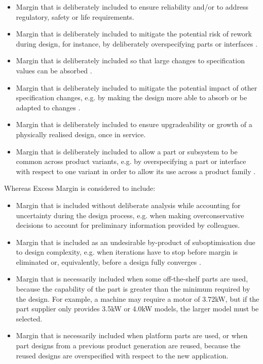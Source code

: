 \begin{itemize} 

\item Margin that is deliberately included to ensure reliability and/or to address regulatory, safety or life requirements. 

\item  Margin that is deliberately included to mitigate the potential risk of rework during design, for instance, by deliberately overspecifying parts or interfaces \citep{Gale1975}. 

\item   Margin that is deliberately included so that large changes to specification values can be absorbed \citep{Martin2002,Tilstra2015}. 

\item   Margin that is deliberately included to mitigate the potential impact of other specification changes, e.g. by making the design more able to absorb or be adapted to changes \citep{Watson2016, Cansler2016, Allen2018}.

\item   Margin that is deliberately included to ensure upgradeability \citep{Guenov2018} or growth \citep{Gale1975} of a physically realised design, once in service.

\item  Margin that is deliberately included to allow a part or subsystem to be common across product variants, e.g. by overspecifying a part or interface with respect to one variant in order to allow its use across a product family \citep{Baldwin2000}.

\end{itemize}

Whereas Excess Margin is considered to include:

\begin{itemize} 
\item  Margin that is included without deliberate analysis while accounting for uncertainty during the design process, e.g. when making overconservative decisions to account for preliminary information provided by colleagues.

\item  Margin that is included as an undesirable by-product of suboptimisation due to design complexity, e.g. when iterations have to stop before margin is eliminated or, equivalently, before a design fully converges \citep{Eckert2004, Eckert2019}.

\item Margin that is necessarily included when some off-the-shelf parts are used, because the capability of the part is greater than the minimum required by the design. For example, a machine may require a motor of 3.72kW, but if the part supplier only provides 3.5kW or 4.0kW models, the larger model must be selected.

\item Margin that is necessarily included when platform parts are used, or when part designs from a previous product generation are reused, because the reused designs are overspecified with respect to the new application.

\end{itemize}

